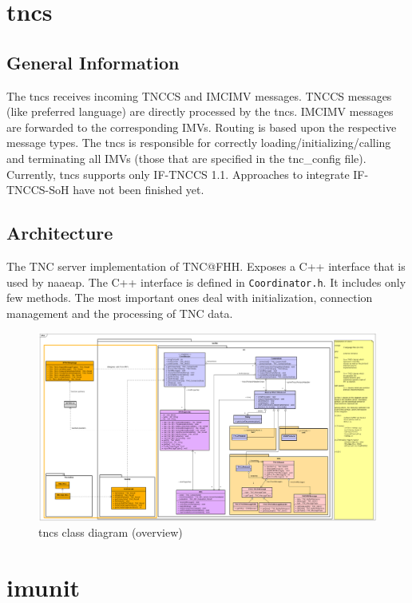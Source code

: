 \documentclass[a4paper,10pt]{scrartcl}
\begin{document}
\section{tncs}
\subsection{General Information}
The tncs receives incoming TNCCS and IMCIMV messages. TNCCS messages
(like preferred language) are directly processed by the tncs. IMCIMV messages are
forwarded to the corresponding IMVs. Routing is based upon the respective message
types. The tncs is responsible for correctly loading/initializing/calling and
terminating all IMVs (those that are specified in the tnc\_config file). Currently,
tncs supports only IF-TNCCS 1.1. Approaches to integrate IF-TNCCS-SoH have not
been finished yet.

\subsection{Architecture}
The TNC server implementation of TNC@FHH. Exposes a C++ interface that is used
by naaeap. The C++ interface is defined in \texttt{Coordinator.h}. It includes
only few methods. The most important ones deal with initialization, connection management
and the processing of TNC data.

\begin{figure}
 \centering
 \includegraphics[width=\textwidth]{design/tncfhh-class-sequence-diagrams-0-6-0/iel-class-0-6-0-light.png}
 \caption{tncs class diagram (overview)}
 \label{fig:tncs-overview}
\end{figure}

\section{imunit}
\end{document}

